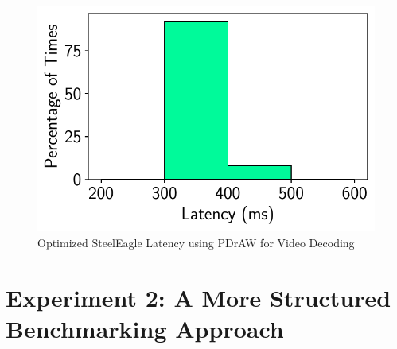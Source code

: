\begin{figure}[htbp]
\centerline{\includegraphics[width = .4\textwidth]{figs/pdraw_latency.pdf}}
\caption{Optimized SteelEagle Latency using PDrAW for Video Decoding}
\label{fig:steeleagle_optimized_latency}
\end{figure}

\section{Experiment 2: A More Structured Benchmarking Approach}
\label{sec:exp2}
